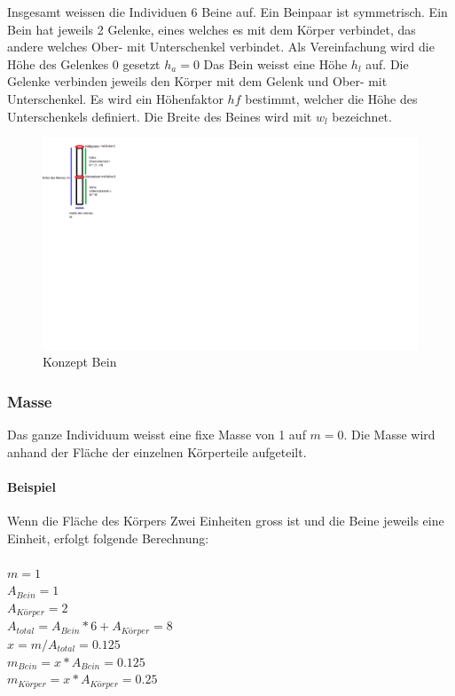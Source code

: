       Insgesamt weissen die Individuen 6 Beine auf. Ein Beinpaar ist symmetrisch. Ein Bein hat jeweils 2 Gelenke,
      eines welches es mit dem Körper verbindet,
      das andere welches Ober- mit Unterschenkel verbindet.
      Als Vereinfachung wird die Höhe des Gelenkes 0 gesetzt  \(h_{a} = 0\)
      Das Bein weisst eine Höhe \(h_{l}\) auf. Die Gelenke verbinden jeweils den Körper mit dem Gelenk und Ober- mit
      Unterschenkel. Es wird ein Höhenfaktor \(hf\) bestimmt, welcher die Höhe des Unterschenkels definiert.
      Die Breite des Beines wird mit \(w_{l}\) bezeichnet.
      \\
      \begin{figure}[H]
        \includegraphics[scale=1]{graphics/leg}
        \caption{Konzept Bein\label{fig:conceptLeg}}
      \end{figure}

      \subsubsection{Masse\label{subs:Masse}}

        Das ganze Individuum weisst eine fixe Masse von 1 auf \(m = 0\).
        Die Masse wird anhand der Fläche der einzelnen Körperteile aufgeteilt.
      \paragraph{Beispiel\label{par:MasseExample}}
        Wenn die Fläche des Körpers Zwei Einheiten gross ist und die Beine jeweils eine Einheit,
        erfolgt folgende Berechnung:
        \\
        \\
        \(m = 1\) \\
        \(A_{Bein} = 1\) \\
        \(A_{Körper} = 2\) \\
        \(A_{total} = A_{Bein} * 6 + A_{Körper} = 8 \) \\
        \( x = m / A_{total} = 0.125 \) \\
        \(m_{Bein} = x * A_{Bein} = 0.125\) \\
        \(m_{Körper} = x * A_{Körper} = 0.25\) \\

